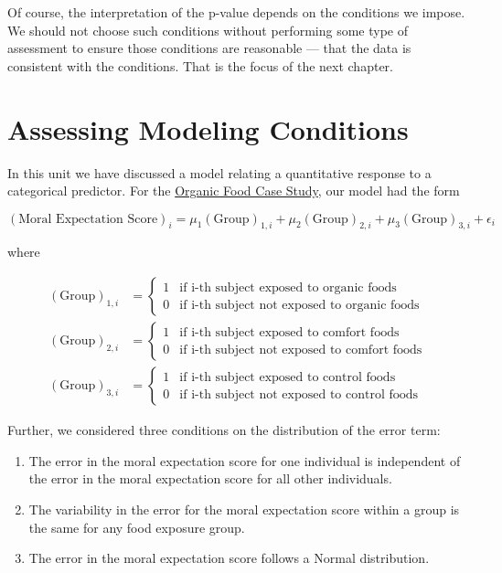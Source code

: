 \documentclass[]{book}
\providecommand{\tightlist}{%
  \setlength{\itemsep}{0pt}\setlength{\parskip}{0pt}}
\theoremstyle{plain}
\theoremstyle{mydefn}
\theoremstyle{myexmpl}
\theoremstyle{remark}
\begin{document}
Of course, the interpretation of the p-value depends on the conditions
we impose. We should not choose such conditions without performing some
type of assessment to ensure those conditions are reasonable --- that
the data is consistent with the conditions. That is the focus of the
next chapter.

\chapter{Assessing Modeling Conditions}\label{ANOVAassessment}

In this unit we have discussed a model relating a quantitative response
to a categorical predictor. For the
\protect\hyperlink{CaseOrganic}{Organic Food Case Study}, our model had
the form

\[(\text{Moral Expectation Score})_i = \mu_1 (\text{Group})_{1,i} + \mu_2 (\text{Group})_{2,i} + \mu_3 (\text{Group})_{3,i} + \epsilon_i\]

where

\[
\begin{aligned}
  (\text{Group})_{1,i} &= \begin{cases}
    1 & \text{if i-th subject exposed to organic foods} \\
    0 & \text{if i-th subject not exposed to organic foods} 
    \end{cases} \\
  (\text{Group})_{2,i} &= \begin{cases}
    1 & \text{if i-th subject exposed to comfort foods} \\
    0 & \text{if i-th subject not exposed to comfort foods} 
    \end{cases} \\
  (\text{Group})_{3,i} &= \begin{cases}
    1 & \text{if i-th subject exposed to control foods} \\
    0 & \text{if i-th subject not exposed to control foods}
    \end{cases}
\end{aligned}
\]

Further, we considered three conditions on the distribution of the error
term:

\begin{enumerate}
\def\labelenumi{\arabic{enumi}.}
\tightlist
\item
  The error in the moral expectation score for one individual is
  independent of the error in the moral expectation score for all other
  individuals.\\
\item
  The variability in the error for the moral expectation score within a
  group is the same for any food exposure group.
\item
  The error in the moral expectation score follows a Normal
  distribution.
\end{enumerate}
\end{document}
